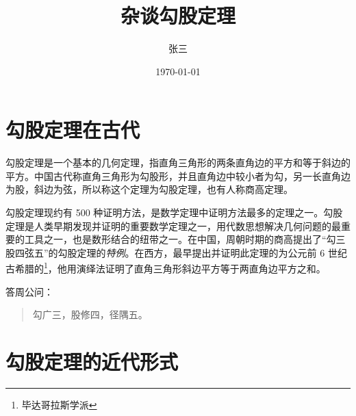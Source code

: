\documentclass[UTF8]{ctexart}
\title{杂谈勾股定理}
\author{张三}
\date{\today}
\begin{document}
\maketitle
\tableofcontents
\begin{abstract}
    
\end{abstract}
\section{勾股定理在古代}
勾股定理是一个基本的几何定理，指直角三角形的两条直角边的平方和等于斜边的平方。中国古代称直角三角形为勾股形，并且直角边中较小者为勾，另一长直角边为股，斜边为弦，所以称这个定理为勾股定理，也有人称商高定理。

勾股定理现约有 500 种证明方法，是数学定理中证明方法最多的定理之一。勾股定理是人类早期发现并证明的重要数学定理之一，用代数思想解决几何问题的最重要的工具之一，也是数形结合的纽带之一。在中国，周朝时期的商高提出了“勾三股四弦五”的勾股定理的\emph{特例}。在西方，最早提出并证明此定理的为公元前 6 世纪古希腊的\footnote{毕达哥拉斯学派}，他用演绎法证明了直角三角形斜边平方等于两直角边平方之和。

答周公问：
\begin{quote}
\kaishu 勾广三，股修四，径隅五。
\end{quote}
\section{勾股定理的近代形式}

\end{document}
